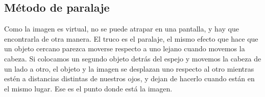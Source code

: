 \subsection{Método de paralaje}
Como la imagen es virtual, no se puede atrapar en una pantalla, y hay que encontrarla de otra manera. El truco es el paralaje, el mismo efecto que hace que un objeto cercano parezca moverse respecto a uno lejano cuando movemos la cabeza. Si colocamos un segundo objeto detrás del espejo y movemos la cabeza de un lado a otro, el objeto y la imagen se desplazan uno respecto al otro mientras estén a distancias distintas de nuestros ojos, y dejan de hacerlo cuando están en el mismo lugar. Ese es el punto donde está la imagen.
